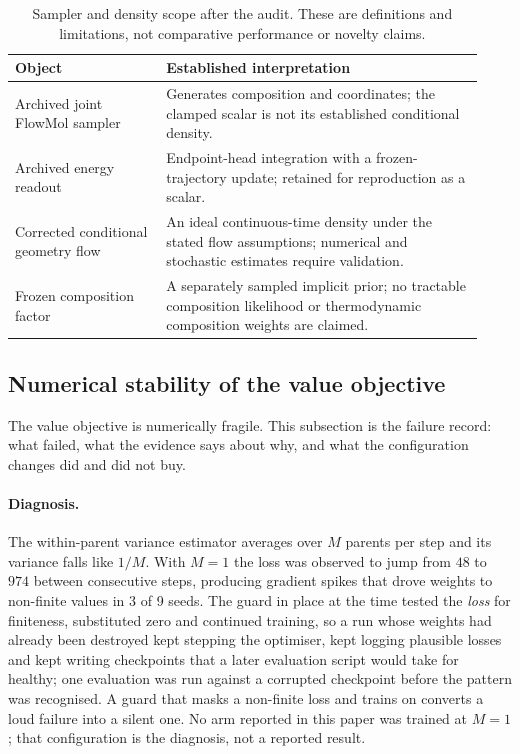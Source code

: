 \begin{table}[h]
\centering
\caption{Sampler and density scope after the audit. These are definitions and
limitations, not comparative performance or novelty claims.}
\label{tab:capability}
\begin{tabular}{p{0.30\linewidth}p{0.63\linewidth}}
\toprule
Object & Established interpretation \\
\midrule
Archived joint FlowMol sampler & Generates composition and coordinates; the clamped
scalar is not its established conditional density. \\
Archived energy readout & Endpoint-head integration with a frozen-trajectory update;
retained for reproduction as a scalar. \\
Corrected conditional geometry flow & An ideal continuous-time density under the
stated flow assumptions; numerical and stochastic estimates require validation. \\
Frozen composition factor & A separately sampled implicit prior; no tractable
composition likelihood or thermodynamic composition weights are claimed. \\
\bottomrule
\end{tabular}
\end{table}

\subsection{Numerical stability of the value objective}
\label{app:stability}

The value objective is numerically fragile. This subsection is the failure record:
what failed, what the evidence says about why, and what the configuration changes did
and did not buy.

\paragraph{Diagnosis.} The within-parent variance estimator averages over $M$ parents
per step and its variance falls like $1/M$. With $M = 1$ the loss was observed to jump
from $48$ to $974$ between consecutive steps, producing gradient spikes that drove
weights to non-finite values in 3 of 9 seeds. The guard in place at the time tested the
\emph{loss} for finiteness, substituted zero and continued training, so a run whose
weights had already been destroyed kept stepping the optimiser, kept logging plausible
losses and kept writing checkpoints that a later evaluation script would take for
healthy; one evaluation was run against a corrupted checkpoint before the pattern was
recognised. A guard that masks a non-finite loss and trains on converts a loud failure
into a silent one. No arm reported in this paper was trained at $M = 1$; that
configuration is the diagnosis, not a reported result.


